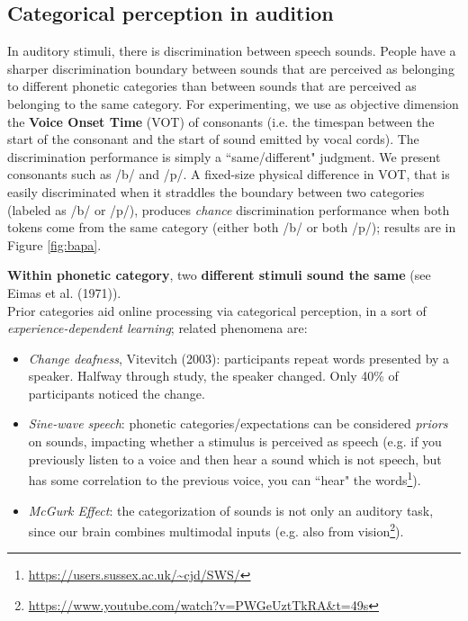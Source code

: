 \subsection{Categorical perception in audition}
In auditory stimuli, there is discrimination between speech sounds. People have a sharper discrimination boundary between sounds that are perceived as belonging to different phonetic categories than between sounds that are perceived as belonging to the same category.
For experimenting, we use as objective dimension the \textbf{Voice Onset Time} (VOT) of consonants (i.e. the timespan between the start of the consonant and the start of sound emitted by vocal cords). The discrimination performance is simply a ``same/different" judgment. We present consonants such as /b/ and /p/. A fixed-size physical difference in VOT, that is easily discriminated when it straddles the boundary between two categories (labeled as /b/ or /p/), produces \textit{chance} discrimination performance when both tokens come from the same category (either both /b/ or both /p/); results are in Figure \ref{fig:bapa}.

\textbf{Within phonetic category}, two \textbf{different stimuli sound the same} (see \notedv Eimas et al. (1971)).\\

Prior categories aid online processing via categorical perception, in a sort of \textit{experience-dependent learning}; related phenomena are:
\begin{itemize}
    \item \textit{Change deafness}, Vitevitch (2003): participants repeat words presented by a speaker. Halfway through study, the speaker changed. Only 40\% of participants noticed the change.
    \item \textit{Sine-wave speech}: phonetic categories/expectations can be considered \textit{priors} on sounds, impacting whether a stimulus is perceived as speech (e.g. if you previously listen to a voice and then hear a sound which is not speech, but has some correlation to the previous voice, you can ``hear" the words\footnote{\url{https://users.sussex.ac.uk/~cjd/SWS/}}).
    \item \textit{McGurk Effect}: the categorization of sounds is not only an auditory task, since our brain combines multimodal inputs (e.g. also from vision\footnote{\url{https://www.youtube.com/watch?v=PWGeUztTkRA&t=49s}}).
\end{itemize}

